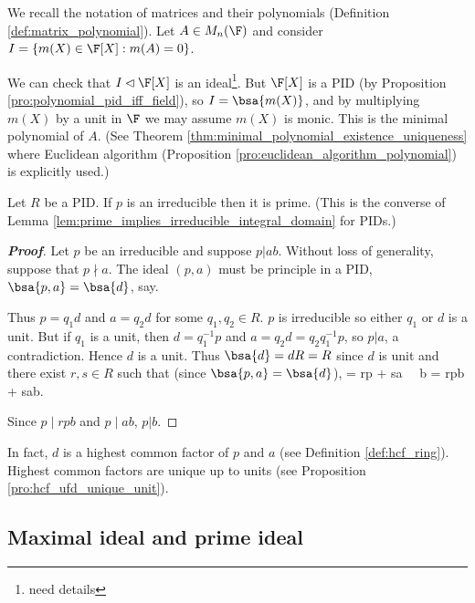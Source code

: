 \begin{example}
We recall the notation of matrices and their polynomials (Definition \ref{def:matrix_polynomial}). Let $A \in M_{n}(\F)$ and consider $I = \{m(X) \in \F[X] : m(A) = 0\}$.

We can check that $I \lhd \F[X]$ is an ideal\footnote{need details}. But $\F[X]$ is a PID (by Proposition \ref{pro:polynomial_pid_iff_field}), so $I = \bsa{m(X)}$, and by multiplying $m(X)$ by a
unit in $\F$ we may assume $m(X)$ is monic. This is the minimal polynomial of $A$. (See Theorem \ref{thm:minimal_polynomial_existence_uniqueness} where Euclidean algorithm (Proposition
\ref{pro:euclidean_algorithm_polynomial}) is explicitly used.) %
\end{example}


\begin{lemma}\label{lem:pid_irreducible_prime}
Let $R$ be a PID. If $p$ is an irreducible then it is prime. (This is the converse of Lemma \ref{lem:prime_implies_irreducible_integral_domain} for PIDs.)
\end{lemma}

\begin{proof}[\bf Proof]
Let $p$ be an irreducible and suppose $p | ab$. Without loss of generality, suppose that $p \nmid a$. The ideal $(p, a)$ must be principle in a PID, $\bsa{p, a} = \bsa{d}$, say.

Thus $p = q_1d$ and $a = q_2d$ for some $q_1,q_2 \in R$. $p$ is irreducible so either $q_1$ or $d$ is a unit. But if $q_1$ is a unit, then $d = q_1^{-1} p$ and $a = q_2d = q_2q^{-1}_1 p$, so $p | a$, a contradiction. Hence $d$ is a unit. Thus $\bsa{d} = dR = R$ since $d$ is unit and there exist $r, s \in R$ such that (since $\bsa{p, a} = \bsa{d}$),
 = rp + sa \ \ra \ b = rpb + sab.
\ee

Since $p \mid rpb$ and $p \mid ab$, $p | b$.
\end{proof}

\begin{remark}
In fact, $d$ is a highest common factor of $p$ and $a$ (see Definition \ref{def:hcf_ring}). Highest common factors are unique up to units (see Proposition \ref{pro:hcf_ufd_unique_unit}).%
\end{remark}


\subsection{Maximal ideal and prime ideal}

